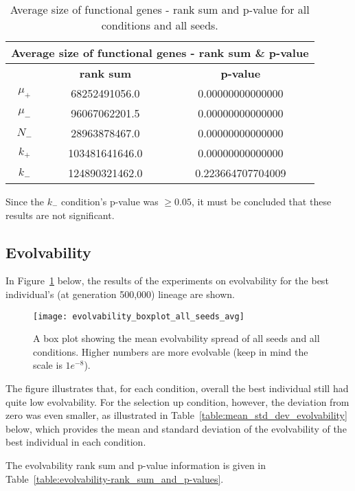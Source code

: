 \begin{table}[H]
	\begin{tabular}{|c|c|c|}
		\hline
		\multicolumn{3}{c}{\Large \textbf{Average size of functional genes - rank sum \& p-value}} \\
		\hline
		& \textbf{rank sum} & \textbf{p-value} \\
		\hline
		$\mu_+$ & 68252491056.0 & 0.00000000000000 \\
		\hline
		$\mu_-$ & 96067062201.5 & 0.00000000000000 \\
		\hline
		$N_-$ & 28963878467.0 & 0.00000000000000 \\
		\hline
		$k_+$ & 103481641646.0 & 0.00000000000000 \\
		\hline
		$k_-$ & 124890321462.0 & 0.223664707704009 \\
		\hline
	\end{tabular}
	\caption[Average size of functional genes - rank sum and p-value]{Average size of functional genes - rank sum and p-value for all conditions and all seeds.}
	\label{table:avg_size_of_functional_genes_rank_sum_and_p-value}
\end{table}
Since the $k_-$ condition's p-value was $\geq0.05$, it must be concluded that these results are not significant. 

\subsection{Evolvability}
In Figure~\ref{fig:evolvability_mean} below, the results of the experiments on evolvability for the best individual's (at generation 500,000) lineage are shown. 
\begin{figure}[H]
	\centering
	\texttt{[image: evolvability\_boxplot\_all\_seeds\_avg]}
	\caption[Evolvability boxplot]{A box plot showing the mean evolvability spread of all seeds and all conditions. Higher numbers are more evolvable (keep in mind the scale is $1e^{-8}$). }
	\label{fig:evolvability_mean}	
\end{figure}
The figure illustrates that, for each condition, overall the best individual still had quite low evolvability. For the selection up condition, however, the deviation from zero was even smaller, as illustrated in Table~\ref{table:mean_std_dev_evolvability} below, which provides the mean and standard deviation of the evolvability of the best individual in each condition. 

The evolvability rank sum and p-value information is given in Table~\ref{table:evolvability-rank_sum_and_p-values}.


